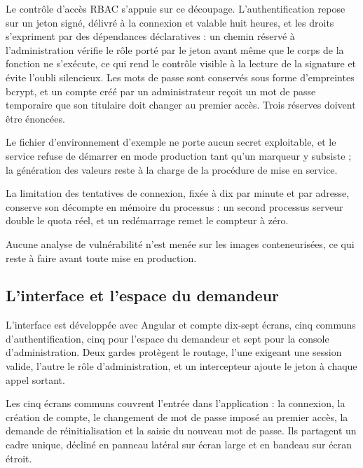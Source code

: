 Le contrôle d'accès RBAC s'appuie sur ce découpage. L'authentification repose sur un jeton signé,
délivré à la connexion et valable huit heures, et les droits s'expriment par des dépendances
déclaratives : un chemin réservé à l'administration vérifie le rôle porté par le jeton avant même
que le corps de la fonction ne s'exécute, ce qui rend le contrôle visible à la lecture de la
signature et évite l'oubli silencieux. Les mots de passe sont conservés sous forme d'empreintes
bcrypt, et un compte créé par un administrateur reçoit un mot de passe temporaire que son titulaire
doit changer au premier accès. Trois réserves doivent être énoncées.

\begin{puces}
  \item Le fichier d'environnement d'exemple ne porte aucun secret exploitable, et le service
        refuse de démarrer en mode production tant qu'un marqueur y subsiste ; la génération des
        valeurs reste à la charge de la procédure de mise en service.
  \item La limitation des tentatives de connexion, fixée à dix par minute et par adresse, conserve
        son décompte en mémoire du processus : un second processus serveur double le quota réel, et
        un redémarrage remet le compteur à zéro.
  \item Aucune analyse de vulnérabilité n'est menée sur les images conteneurisées, ce qui reste à
        faire avant toute mise en production.
\end{puces}

\subsection{L'interface et l'espace du demandeur}

\label{sec:frontend6}

L'interface est développée avec Angular et compte dix-sept écrans, cinq communs d'authentification,
cinq pour l'espace du demandeur et sept pour la console d'administration. Deux gardes protègent le
routage, l'une exigeant une session valide, l'autre le rôle d'administration, et un intercepteur
ajoute le jeton à chaque appel sortant.

\label{sec:acces6}

Les cinq écrans communs couvrent l'entrée dans l'application : la connexion, la création de compte,
le changement de mot de passe imposé au premier accès, la demande de réinitialisation et la saisie
du nouveau mot de passe. Ils partagent un cadre unique, décliné en panneau latéral sur écran large
et en bandeau sur écran étroit.

